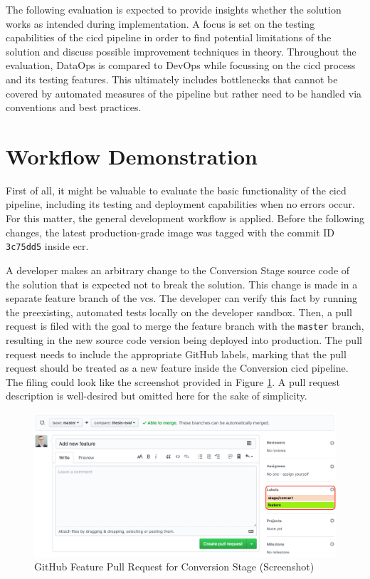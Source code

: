 
The following evaluation is expected to provide insights whether the solution works as intended during implementation. A focus is set on the testing capabilities of the \ac{cicd} pipeline in order to find potential limitations of the solution and discuss possible improvement techniques in theory. Throughout the evaluation, DataOps is compared to DevOps while focussing on the \ac{cicd} process and its testing features. This ultimately includes bottlenecks that cannot be covered by automated measures of the pipeline but rather need to be handled via conventions and best practices.

\section{Workflow Demonstration}
First of all, it might be valuable to evaluate the basic functionality of the \ac{cicd} pipeline, including its testing and deployment capabilities when no errors occur. For this matter, the general development workflow is applied. Before the following changes, the latest production-grade image was tagged with the commit ID \texttt{3c75dd5} inside \ac{ecr}.

A developer makes an arbitrary change to the Conversion Stage source code of the solution that is expected not to break the solution. This change is made in a separate feature branch of the \ac{vcs}. The developer can verify this fact by running the preexisting, automated tests locally on the developer sandbox. Then, a pull request is filed with the goal to merge the feature branch with the \texttt{master} branch, resulting in the new source code version being deployed into production. The pull request needs to include the appropriate GitHub labels, marking that the pull request should be treated as a new feature inside the Conversion \ac{cicd} pipeline. The filing could look like the screenshot provided in Figure \ref{fig:6-pr}. A pull request description is well-desired but omitted here for the sake of simplicity.
\newpage
\begin{figure}[h!]
	\centering
	\includegraphics[width=\linewidth]{main-matter/img/6-pr.png}
	\caption{GitHub Feature Pull Request for Conversion Stage (Screenshot)}
	\label{fig:6-pr}	
\end{figure}

